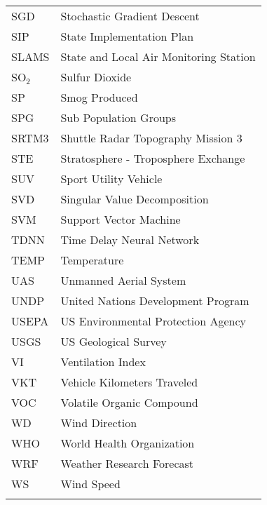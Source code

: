 \begin{longtable}{ll}
SGD & Stochastic Gradient Descent \\
SIP & State Implementation Plan \\
SLAMS & State and Local Air Monitoring Station \\
SO$_{2}$ & Sulfur Dioxide \\
SP & Smog Produced \\
SPG & Sub Population Groups \\
SRTM3 & Shuttle Radar Topography Mission 3 \\
STE & Stratosphere - Troposphere Exchange \\
SUV & Sport Utility Vehicle \\
SVD & Singular Value Decomposition \\
SVM & Support Vector Machine \\
TDNN & Time Delay Neural Network \\
TEMP & Temperature \\
UAS & Unmanned Aerial System \\
UNDP & United Nations Development Program \\
USEPA & US Environmental Protection Agency \\
USGS & US Geological Survey \\
VI & Ventilation Index \\
VKT & Vehicle Kilometers Traveled \\
VOC & Volatile Organic Compound \\
WD & Wind Direction \\
WHO & World Health Organization \\
WRF & Weather Research Forecast \\
WS & Wind Speed \\
\\ \hline
\end{longtable}

\clearpage
